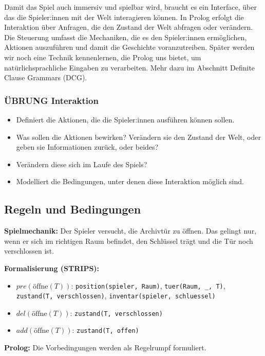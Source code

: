 \documentclass[parskip=half,a4paper,11pt]{scrreprt}
\begin{document}
Damit das Spiel auch immersiv und spielbar wird, braucht es ein Interface, über das die Spieler:innen mit der Welt interagieren können. In Prolog erfolgt die Interaktion über Anfragen, die den Zustand der Welt abfragen oder verändern. Die Steuerung umfasst die Mechaniken, die es den Spieler:innen ermöglichen, Aktionen auszuführen und damit die Geschichte voranzutreiben. Später werden wir noch eine Technik kennenlernen, die Prolog uns bietet, um natürlichsprachliche Eingaben zu verarbeiten. Mehr dazu im Abschnitt Definite Clause Grammars (DCG).

\subsubsection{ÜBRUNG Interaktion}
\begin{itemize}
    \item Definiert die Aktionen, die die Spieler:innen ausführen können sollen. 
    \item Was sollen die Aktionen bewirken? Verändern sie den Zustand der Welt, oder geben sie Informationen zurück, oder beides?
    \item Verändern diese sich im Laufe des Spiels?
    \item Modelliert die Bedingungen, unter denen diese Interaktion möglich sind.
\end{itemize}

\subsection{Regeln und Bedingungen}

\textbf{Spielmechanik:} Der Spieler versucht, die Archivtür zu öffnen. Das gelingt nur, wenn er sich im richtigen Raum befindet, den Schlüssel trägt und die Tür noch verschlossen ist.

\textbf{Formalisierung (STRIPS):}
\begin{itemize}
    \item $pre(\text{öffne}(T))$: \texttt{position(spieler, Raum)}, \texttt{tuer(Raum, \_, T)}, \texttt{zustand(T, verschlossen)}, \texttt{inventar(spieler, schluessel)}
    \item $del(\text{öffne}(T))$: \texttt{zustand(T, verschlossen)}
    \item $add(\text{öffne}(T))$: \texttt{zustand(T, offen)}
\end{itemize}

\textbf{Prolog:} Die Vorbedingungen werden als Regelrumpf formuliert.
\end{document}

